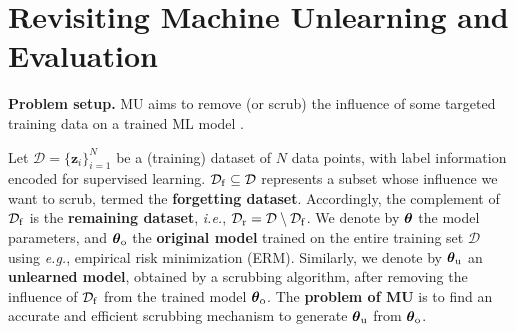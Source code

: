 

\section{Revisiting Machine Unlearning and Evaluation}
\label{sec: primer_MU}



\iffalse 
In this section, we begin by formulating the problem of {\MU} (machine unlearning) and     reviewing  unlearning methods regarded as baselines in this work. Next, we  revisit how the
unlearning performance can be assessed using diverse and    complementary  metrics.
\fi 


\noindent \textbf{Problem setup.}
MU aims to remove ({or} scrub) the influence of some targeted training data on a trained ML model \cite{cao2015towards,bourtoule2021machine}. 
\iffalse 
This problem was  raised for protecting data privacy 
\citep{cao2015towards,bourtoule2021machine}, in particular in coming forth with legislation like  General Data Protection Regulation (GDPR) \cite{hoofnagle2019european} and  California Consumer Privacy Act (CCPA) \cite{pardau2018california}. It can also be viewed as a method of understanding dataset influence
in model training
\cite{koh2017understanding}. 
\fi 
Let $\mathcal{D} = \{\mathbf z_i \}_{i=1}^N$ be a (training) dataset of $N$  data points, with label information encoded for supervised learning. $\mathcal D_\mathrm{f} \subseteq \mathcal D$ represents  a subset whose influence we want to scrub, termed
the \textbf{forgetting dataset}.
Accordingly, the complement of $\mathcal D_\mathrm{f}$ is the \textbf{remaining dataset}, \textit{i.e.}, $\mathcal D_\mathrm{r} = \mathcal D \setminus \mathcal{D}_{\mathrm{f}}$.
We denote by $\boldsymbol{\theta}$ the model parameters, and $\boldsymbol \theta_\mathrm{o}$   the \textbf{original  model} trained    on the entire training set  $\mathcal D$ using \textit{e.g.}, empirical risk minimization (ERM). Similarly, we denote by $\boldsymbol \theta_\mathrm{u}$  an \textbf{unlearned model}, obtained by a scrubbing algorithm, after    removing the influence of $\mathcal D_\mathrm{f}$ from the  trained model $\boldsymbol \theta_\mathrm{o}$. The \textbf{problem of MU} is to find an accurate and efficient  scrubbing mechanism  to generate  $\boldsymbol \theta_\mathrm{u}$   from  $\boldsymbol \theta_\mathrm{o}$. 
